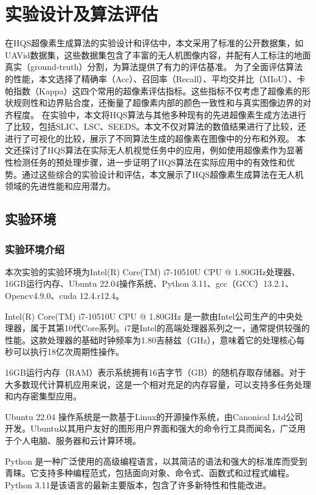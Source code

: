 \newpage

\section{实验设计及算法评估}
在HQS超像素生成算法的实验设计和评估中，本文采用了标准的公开数据集，如UAVid数据集，这些数据集包含了丰富的无人机图像内容，并配有人工标注的地面真实（ground-truth）分割，为算法提供了有力的评估基准。
为了全面评估算法的性能，本文选择了精确率（Acc）、召回率（Recall）、平均交并比（MIoU）、卡帕指数（Kappa）这四个常用的超像素评估指标。这些指标不仅考虑了超像素的形状规则性和边界贴合度，还衡量了超像素内部的颜色一致性和与真实图像边界的对齐程度。
在实验中，本文将HQS算法与其他多种现有的先进超像素生成方法进行了比较，包括SLIC、LSC、SEEDS。本文不仅对算法的数值结果进行了比较，还进行了可视化的比较，展示了不同算法生成的超像素在图像中的分布和外观。
本文还探讨了HQS算法在实际无人机视觉任务中的应用，例如使用超像素作为显著性检测任务的预处理步骤，进一步证明了HQS算法在实际应用中的有效性和优势。通过这些综合的实验设计和评估，本文展示了HQS超像素生成算法在无人机领域的先进性能和应用潜力。

\subsection{实验环境}
\subsubsection{实验环境介绍}

本次实验的实验环境为Intel(R) Core(TM) i7-10510U CPU @ 1.80GHz处理器、16GB运行内存、Ubuntu 22.04操作系统、Python 3.11、gcc（GCC）13.2.1、Opencv4.9.0、cuda 12.4.r12.4。

Intel(R) Core(TM) i7-10510U CPU @ 1.80GHz 是一款由Intel公司生产的中央处理器，属于其第10代Core系列。i7是Intel的高端处理器系列之一，通常提供较强的性能。这款处理器的基础时钟频率为1.80吉赫兹（GHz），意味着它的处理核心每秒可以执行18亿次周期性操作。

16GB运行内存（RAM）表示系统拥有16吉字节（GB）的随机存取存储器。对于大多数现代计算机应用来说，这是一个相对充足的内存容量，可以支持多任务处理和内存密集型应用。

Ubuntu 22.04 操作系统是一款基于Linux的开源操作系统，由Canonical Ltd公司开发。Ubuntu以其用户友好的图形用户界面和强大的命令行工具而闻名，广泛用于个人电脑、服务器和云计算环境。

Python 是一种广泛使用的高级编程语言，以其简洁的语法和强大的标准库而受到青睐。它支持多种编程范式，包括面向对象、命令式、函数式和过程式编程。Python 3.11是该语言的最新主要版本，包含了许多新特性和性能改进。

